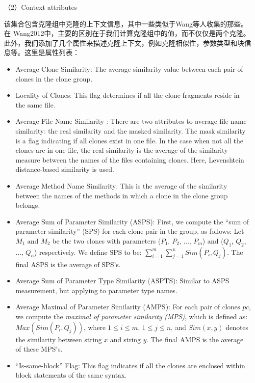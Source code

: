 （2）Context attributes

该集合包含克隆组中克隆的上下文信息，其中一些类似于Wang等人收集的那些。 在\cite{} {Wang2012}中，主要的区别在于我们计算克隆组中的值，而不仅仅是两个克隆。此外，我们添加了几个属性来描述克隆上下文，例如克隆相似性，参数类型和块信息等。这里是属性列表：

\begin{itemize}

\item Average Clone Similarity: 
The average similarity value between each pair of clones in the clone group. 

\item Locality of Clones: 
This flag determines if all the clone fragments reside in the same file. 

\item Average File Name Similarity : 
There are two attributes to average file name similarity: the real similarity and the masked similarity. 
The mask similarity is a flag indicating if all clones exist in one file. 
In the case when not all the clones are in one file, the real similarity is the average of the similarity measure between the names of the files containing clones. 
Here, Levenshtein distance-based similarity \cite{Navarro2001} is used. 
  
\item Average Method Name Similarity: 
This is the average of the similarity between the names of the methods in which a clone in the clone group belongs.

\item Average Sum of Parameter Similarity (ASPS): 
First, we compute the ``sum of parameter similarity'' (SPS) for each clone pair in the group, as follows: Let $M_1$ and $M_2$ be the two clones with parameters ($P_1$, $P_2$, $\ldots$, $P_m$) and ($Q_1$, $Q_2$, $\ldots$, $Q_n$) respectively. 
We define SPS to be: $\sum_{i=1}^{m}\sum_{j=1}^{n} \mathit{Sim}(P_i,Q_j)$. 
The final ASPS is the average of SPS's.

\item Average Sum of Parameter Type Similarity (ASPTS): 
Similar to ASPS measurement, but applying to parameter type names.

\item Average Maximal of Parameter Similarity (AMPS): 
For each pair of clones $pc$, we compute the {\em maximal of parameter similarity (MPS)}, which is defined as: $\mathit{Max}(\mathit{Sim}(P_i,Q_j))$, where $1\leq i\leq m$, $1\leq j\leq n$, and $\mathit{Sim}(x, y)$ denotes the similarity between string $x$ and string $y$. 
The final AMPS is the average of these MPS's. 

\item ``Is-same-block'' Flag:  
This flag indicates if all the clones are enclosed within block statements of the same syntax.
\end{itemize}

